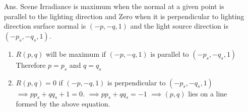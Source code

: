 \documentclass[11pt]{article}
\begin{document}
\begin{enumerate}
\begin{itemize}
\item[Ans.]  Scene Irradiance is maximum when the normal at a given point is parallel to the lighting direction and Zero when it is perpendicular to lighting direction\newline
surface normal is $(-p,-q,1)$ and the light source direction is $(-p_s,-q_s,1)$.\newline
\begin{enumerate}
\item $R(p,q)$ will be maximum if $(-p,-q,1)$ is parallel to $(-p_s,-q_s,1)$\newline
Therefore $p = p_s$ and $q = q_s$
\item $R(p,q) = 0$ if $(-p,-q,1)$ is perpendicular to $(-p_s,-q_s,1)$ \newline
$\implies pp_s + qq_s + 1 = 0$.\newline
$\implies pp_s + qq_s = -1$\newline
$\implies (p,q)$ lies on a line formed by the above equation.
\end{enumerate}

\end{itemize}


\end{enumerate}
\end{document}
